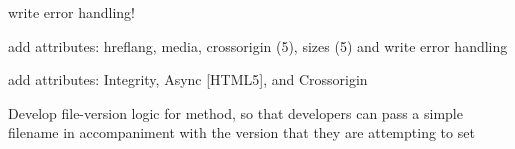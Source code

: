
\begin{DoxyRefList}
\item[\label{todo__todo000001}%
\Hypertarget{todo__todo000001}%
Global \hyperlink{class_w_a_f_f_l_e_1_1_framework_1_1_engines_1_1_bootstrap_a96d284570acb2b50b7e934af06d25c8e}{Bootstrap\+:\+:column} (\$amount=12, \$size=\textquotesingle{}sm\textquotesingle{}, \$content, \$alt=N\+U\+LL)]write error handling!  
\item[\label{todo__todo000003}%
\Hypertarget{todo__todo000003}%
Global \hyperlink{class_w_a_f_f_l_e_1_1_framework_1_1_engines_1_1_h_t_m_l_a7596de1be94a6dc237fa4d435193da8b}{H\+T\+ML\+:\+:link} (\$href, \$rel, \$media=N\+U\+LL, \$download=false)]add attributes\+: hreflang, media, crossorigin (5), sizes (5) and write error handling  
\item[\label{todo__todo000004}%
\Hypertarget{todo__todo000004}%
Global \hyperlink{class_w_a_f_f_l_e_1_1_framework_1_1_engines_1_1_h_t_m_l_a9a92856db6ac937a9dace60224dfaf65}{H\+T\+ML\+:\+:script} (\$src, \$type=false, \$defer=false, \$charset=false)]add attributes\+: Integrity, Async \mbox{[}H\+T\+M\+L5\mbox{]}, and Crossorigin  
\item[\label{todo__todo000005}%
\Hypertarget{todo__todo000005}%
Global \hyperlink{class_w_a_f_f_l_e_1_1_framework_1_1_i_o_1_1_preload_aa570cf9af0fc24953f4568db3a71ae7b}{Preload\+:\+:set\+\_\+script} (\$script)]Develop file-\/version logic for method, so that developers can pass a simple filename in accompaniment with the version that they are attempting to set 
\end{DoxyRefList}